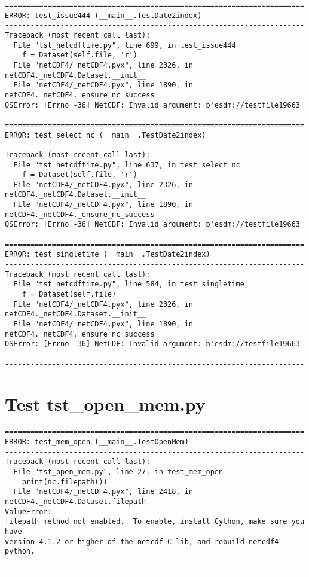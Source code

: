 \begin{verbatim}
======================================================================
ERROR: test_issue444 (__main__.TestDate2index)
----------------------------------------------------------------------
Traceback (most recent call last):
  File "tst_netcdftime.py", line 699, in test_issue444
    f = Dataset(self.file, 'r')
  File "netCDF4/_netCDF4.pyx", line 2326, in netCDF4._netCDF4.Dataset.__init__
  File "netCDF4/_netCDF4.pyx", line 1890, in netCDF4._netCDF4._ensure_nc_success
OSError: [Errno -36] NetCDF: Invalid argument: b'esdm://testfile19663'

======================================================================
ERROR: test_select_nc (__main__.TestDate2index)
----------------------------------------------------------------------
Traceback (most recent call last):
  File "tst_netcdftime.py", line 637, in test_select_nc
    f = Dataset(self.file, 'r')
  File "netCDF4/_netCDF4.pyx", line 2326, in netCDF4._netCDF4.Dataset.__init__
  File "netCDF4/_netCDF4.pyx", line 1890, in netCDF4._netCDF4._ensure_nc_success
OSError: [Errno -36] NetCDF: Invalid argument: b'esdm://testfile19663'

======================================================================
ERROR: test_singletime (__main__.TestDate2index)
----------------------------------------------------------------------
Traceback (most recent call last):
  File "tst_netcdftime.py", line 584, in test_singletime
    f = Dataset(self.file)
  File "netCDF4/_netCDF4.pyx", line 2326, in netCDF4._netCDF4.Dataset.__init__
  File "netCDF4/_netCDF4.pyx", line 1890, in netCDF4._netCDF4._ensure_nc_success
OSError: [Errno -36] NetCDF: Invalid argument: b'esdm://testfile19663'

----------------------------------------------------------------------
\end{verbatim}

\section{Test tst\_open\_mem.py}

\begin{verbatim}
======================================================================
ERROR: test_mem_open (__main__.TestOpenMem)
----------------------------------------------------------------------
Traceback (most recent call last):
  File "tst_open_mem.py", line 27, in test_mem_open
    print(nc.filepath())
  File "netCDF4/_netCDF4.pyx", line 2418, in netCDF4._netCDF4.Dataset.filepath
ValueError:
filepath method not enabled.  To enable, install Cython, make sure you have
version 4.1.2 or higher of the netcdf C lib, and rebuild netcdf4-python.

----------------------------------------------------------------------
\end{verbatim}

